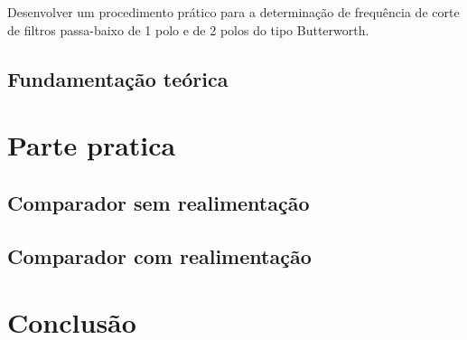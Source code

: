 \documentclass[paper=a4, fontsize=11pt]{article}
\begin{document}
Desenvolver um procedimento prático para a determinação de frequência de corte
de filtros passa-baixo de 1 polo e de 2 polos do tipo Butterworth.

\subsection{Fundamentação teórica}

\section{Parte pratica}

\subsection{Comparador sem realimentação}

\subsection{Comparador com realimentação}

\section{Conclusão}
\end{document}
